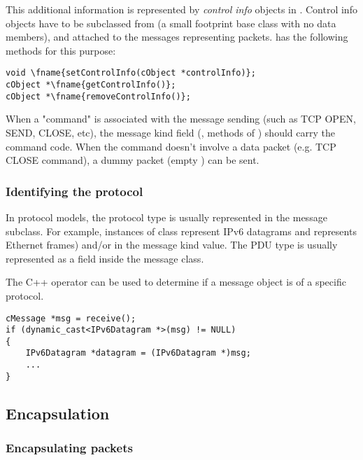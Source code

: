 This additional information is represented by \textit{control info}
objects in {\opp}. Control info objects have to be subclassed from
 (a small footprint base class with
no data members), and attached to the messages representing
packets.  has the following methods for this
purpose:

\begin{Verbatim}[commandchars=\\\{\}]
void \fname{setControlInfo(cObject *controlInfo)};
cObject *\fname{getControlInfo()};
cObject *\fname{removeControlInfo()};
\end{Verbatim}

When a "command" is associated with the message sending (such as
TCP OPEN, SEND, CLOSE, etc), the message kind field (,
 methods of ) should carry the command code.
When the command doesn't involve a data packet (e.g.
TCP CLOSE command), a dummy packet (empty ) can be sent.



\subsubsection{Identifying the protocol}

In {\opp} protocol models, the protocol type is usually represented
in the message subclass. For example, instances of class
 represent IPv6 datagrams and 
represents Ethernet frames) and/or in the message kind value.
The PDU type is usually represented as a field inside the message class.

The C++  operator can be used to determine
if a message object is of a specific protocol.

\begin{verbatim}
cMessage *msg = receive();
if (dynamic_cast<IPv6Datagram *>(msg) != NULL)
{
    IPv6Datagram *datagram = (IPv6Datagram *)msg;
    ...
}
\end{verbatim}


\subsection{Encapsulation}

\subsubsection{Encapsulating packets}

